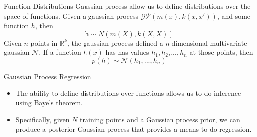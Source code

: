 \documentclass[10pt]{beamer}
\begin{document}
\begin{frame}{Function Distributions}
  Gaussian process allow us to define distributions over the space of functions. Given a gaussian process $\mathcal{GP} \left( m(x) , k(x,x') \right)$, and some function $h$, then
  \begin{equation}
    \mathbf{h} \sim N(m(X) , k(X,X))
  \end{equation}
  Given $n$ points in $\mathbb{R}^{k}$, the gaussian process defined a $n$ dimensional multivariate gaussian $\mathcal{N}$. If a function $h(x)$ has has values $h_1,h_2,...,h_{n}$ at those points, then
  \begin{equation}
    p \left( h \right) \sim \mathcal{N}(h_{1}, ..., h_{n})
  \end{equation}

  \begin{center}
  \end{center}
\end{frame}

\begin{frame}{Gaussian Process Regression }
  \begin{itemize}
  \item The ability to define distributions over functions allows us to do inference using Baye's theorem. 
  \item Specifically, given $N$ training points and a Gaussian process prior, we can produce a posterior Gaussian process that provides a means to do regression. 
  \end{itemize}
  \begin{center}
  \end{center}
\end{frame}
\end{document}
